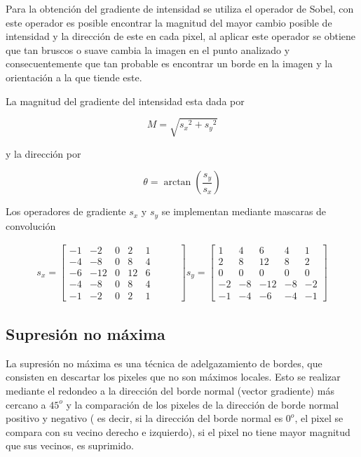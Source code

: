 Para la obtención del gradiente de intensidad se utiliza el operador de Sobel, con este operador es posible encontrar
la magnitud del mayor cambio posible de intensidad y la dirección de este en cada pixel, al aplicar este operador se
obtiene que tan bruscos o suave cambia la imagen en el punto analizado y consecuentemente que tan probable es encontrar
un borde en la imagen y la orientación a la que tiende este.

La magnitud del gradiente del intensidad esta dada por 

\begin{equation}
M=\sqrt{{s_{x}}^{2}+{s_{y}}^{2}}
\end{equation}

y la dirección por

\begin{equation}
\theta = \arctan\left({\frac{s_{y}}{s_{x}}}\right)
\end{equation} 

Los operadores de gradiente $s_{x}$ y $s_{y}$ se implementan mediante mascaras de convolución 

\begin{equation}
\begin{array}{cclcccl}
s_{x} =\begin{bmatrix}
-1 & -2 & 0 & 2 & 1 \\ 
-4 & -8 & 0 & 8 & 4 \\ 
-6 & -12 & 0 & 12 & 6 \\ 
-4 & -8 & 0 & 8 & 4 \\ 
-1 & -2 & 0 & 2 & 1 &\hspace{1em}&
\end{bmatrix}
s_{y} =\begin{bmatrix}
1 & 4 & 6 & 4 & 1 \\ 
2 & 8 & 12 & 8 & 2 \\ 
0 & 0 & 0 & 0 & 0 \\ 
-2 & -8 & -12 & -8 & -2\\ 
-1 & -4 & -6 & -4 & -1
\end{bmatrix} 
\end{array}
\end{equation}

\subsection{Supresión no máxima}

La supresión no máxima es una técnica de adelgazamiento de bordes, que consisten en descartar los pixeles que no son
máximos locales. Esto se realizar mediante el redondeo a la dirección del borde normal (vector gradiente) más cercano a
$45^{o}$ y la comparación de los pixeles de la dirección de borde normal positivo y negativo ( es decir, si la dirección
del borde normal es $0^{o}$, el pixel se compara con su vecino derecho e izquierdo), si el pixel no tiene mayor magnitud
que sus vecinos, es suprimido.


